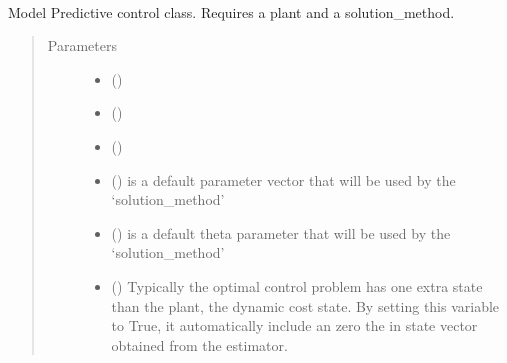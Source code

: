\documentclass[letterpaper,10pt,english]{sphinxmanual}
\begin{document}
\begin{fulllineitems}
\label{\detokenize{yaocptool.mpc:yaocptool.mpc.mpc.MPC}}~

\begin{fulllineitems}
\label{\detokenize{yaocptool.mpc:yaocptool.mpc.mpc.MPC.__init__}}
Model Predictive control class. Requires a plant and a solution\_method.
\begin{quote}\begin{description}
\item[{Parameters}] \leavevmode\begin{itemize}
\item {} 
 () \textendash{} 

\item {} 
 ({\hyperref[\detokenize{yaocptool.methods.base:yaocptool.methods.base.solutionmethodsbase.SolutionMethodsBase}]{}}) \textendash{} 

\item {} 
 ({\hyperref[\detokenize{yaocptool.estimation:yaocptool.estimation.estimator_abstract.EstimatorAbstract}]{}}) \textendash{} 

\item {} 
 () \textendash{} is a default parameter vector that will be used by the ‘solution\_method’

\item {} 
 () \textendash{} is a default theta parameter that will be used by the ‘solution\_method’

\item {} 
 () \textendash{} Typically the optimal control problem has one extra state than the
plant, the dynamic cost state. By setting this variable to True, it automatically include an zero the in state
vector obtained from the estimator.


\end{itemize}
\end{description}
\end{quote}
\end{fulllineitems}
\end{fulllineitems}
\end{document}
